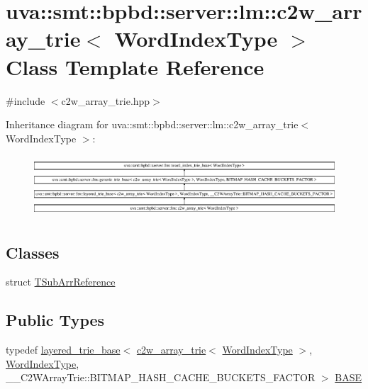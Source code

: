 \hypertarget{classuva_1_1smt_1_1bpbd_1_1server_1_1lm_1_1c2w__array__trie}{}\section{uva\+:\+:smt\+:\+:bpbd\+:\+:server\+:\+:lm\+:\+:c2w\+\_\+array\+\_\+trie$<$ Word\+Index\+Type $>$ Class Template Reference}
\label{classuva_1_1smt_1_1bpbd_1_1server_1_1lm_1_1c2w__array__trie}


{\ttfamily \#include $<$c2w\+\_\+array\+\_\+trie.\+hpp$>$}

Inheritance diagram for uva\+:\+:smt\+:\+:bpbd\+:\+:server\+:\+:lm\+:\+:c2w\+\_\+array\+\_\+trie$<$ Word\+Index\+Type $>$\+:\begin{figure}[H]
\begin{center}
\leavevmode
\includegraphics[height=2.338205cm]{classuva_1_1smt_1_1bpbd_1_1server_1_1lm_1_1c2w__array__trie}
\end{center}
\end{figure}
\subsection*{Classes}
\begin{DoxyCompactItemize}
\item 
struct \hyperlink{structuva_1_1smt_1_1bpbd_1_1server_1_1lm_1_1c2w__array__trie_1_1_t_sub_arr_reference}{T\+Sub\+Arr\+Reference}
\end{DoxyCompactItemize}
\subsection*{Public Types}
\begin{DoxyCompactItemize}
\item 
typedef \hyperlink{classuva_1_1smt_1_1bpbd_1_1server_1_1lm_1_1layered__trie__base}{layered\+\_\+trie\+\_\+base}$<$ \hyperlink{classuva_1_1smt_1_1bpbd_1_1server_1_1lm_1_1c2w__array__trie}{c2w\+\_\+array\+\_\+trie}$<$ \hyperlink{classuva_1_1smt_1_1bpbd_1_1server_1_1lm_1_1word__index__trie__base_a64279b5b94c421b25aedaa72e73d013c}{Word\+Index\+Type} $>$, \hyperlink{classuva_1_1smt_1_1bpbd_1_1server_1_1lm_1_1word__index__trie__base_a64279b5b94c421b25aedaa72e73d013c}{Word\+Index\+Type}, \+\_\+\+\_\+\+C2\+W\+Array\+Trie\+::\+B\+I\+T\+M\+A\+P\+\_\+\+H\+A\+S\+H\+\_\+\+C\+A\+C\+H\+E\+\_\+\+B\+U\+C\+K\+E\+T\+S\+\_\+\+F\+A\+C\+T\+O\+R $>$ \hyperlink{classuva_1_1smt_1_1bpbd_1_1server_1_1lm_1_1c2w__array__trie_a8897c17fb2c7a3bbd1baa91630f886c7}{B\+A\+S\+E}
\end{DoxyCompactItemize}
